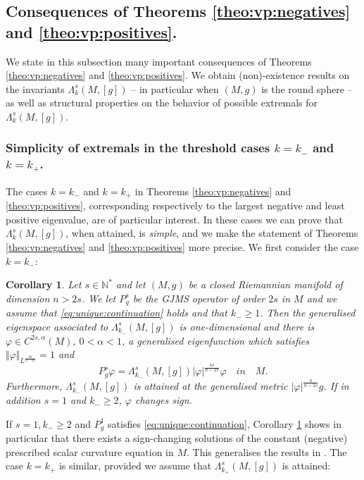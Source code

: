 \documentclass[10pt]{amsart}
\numberwithin{equation}{section}
\def\La{{\Lambda}}
\def\phi{{\varphi}}
\newcommand{\vp}{\varphi}
\theoremstyle{plain}
\newtheorem{corol}[theo]{Corollary}%
\theoremstyle{remark}
\begin{document}
\subsection{Consequences of Theorems  \ref{theo:vp:negatives} and   \ref{theo:vp:positives}.}

We state in this subsection many important consequences of Theorems  \ref{theo:vp:negatives} and   \ref{theo:vp:positives}. We obtain (non)-existence results on the invariants $\La_k^s(M,[g])$ -- in particular when $(M,g)$ is the round sphere -- as well as structural properties on the behavior of possible extremals for $\Lambda_k^s(M,[g])$. 


\subsubsection{Simplicity of extremals in the threshold cases $k=k_-$ and $k=k_+$.} The cases $k = k_-$ and $k= k_+$ in Theorems \ref{theo:vp:negatives} and \ref{theo:vp:positives}, corresponding respectively to the largest negative and least positive eigenvalue, are of particular interest. In these cases we can prove that $\Lambda_k^s(M,[g])$, when attained, is \emph{simple}, and we make the statement of Theorems \ref{theo:vp:negatives} and \ref{theo:vp:positives} more precise. We first consider the case $k = k_-$:
\begin{corol} \label{corol:k:moins}
Let $s \in \mathbb{N}^*$ and let $(M,g)$ be a closed Riemannian manifold of dimension $n > 2s$. We let $P_g^s$ be the GJMS operator of order $2s$ in $M$ and we assume that \eqref{eq:unique:continuation} holds and that $k_- \ge 1$.  Then the generalised eigenspace associated to $\Lambda_{k_-}^s(M,[g])$ is one-dimensional and there is $\varphi \in C^{2s,\alpha}(M)$, $0< \alpha < 1$, a generalised eigenfunction which satisfies $\Vert \vp \Vert_{L^\frac{2n}{n-2s}} = 1$ and  
$$P_g^s\varphi =  \Lambda_{k_-}^s(M,[g])|\varphi|^{\frac{4s}{n-2s}} \phi \quad { in }  \quad M. $$
Furthermore, $ \Lambda_{k_-}^s(M,[g])$ is attained at the generalised metric $|\vp|^{\frac{4}{n-2s}} g$. If in addition $s=1$ and $k_- \geq 2$, $\varphi$ changes sign. \end{corol}

If $s=1, k_- \ge 2$ and $P_g^1$ satisfies \eqref{eq:unique:continuation}, Corollary \ref{corol:k:moins} shows in particular that there exists a sign-changing solutions of the constant (negative) prescribed scalar curvature equation in $M$. This generalises the results in \cite{GurskyPerez}. The case $k = k_+$ is similar, provided we assume that $\Lambda_{k_+}^s(M,[g])$ is attained: 
\end{document}
